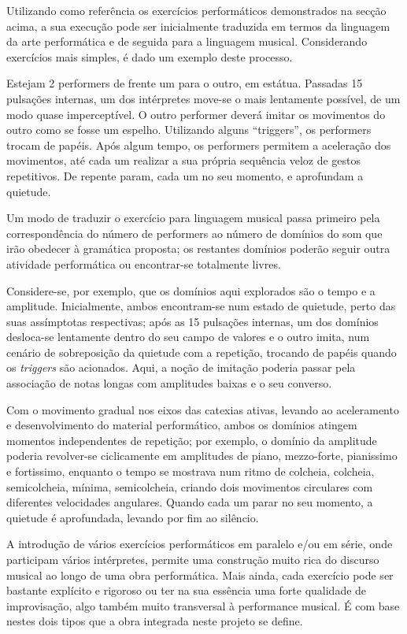 \documentclass[../main.tex]{subfiles}
\begin{document}
Utilizando como referência os exercícios performáticos demonstrados na secção acima, a sua execução pode ser inicialmente traduzida em termos da linguagem da arte performática e de seguida para a linguagem musical. Considerando exercícios mais simples, é dado um exemplo deste processo.

\begin{performex}
    Estejam 2 performers de frente um para o outro, em estátua. Passadas 15 pulsações internas, um dos intérpretes move-se o mais lentamente possível, de um modo quase imperceptível. O outro performer deverá imitar os movimentos do outro como se fosse um espelho. Utilizando alguns \enquote{triggers}, os performers trocam de papéis. Após algum tempo, os performers permitem a aceleração dos movimentos, até cada um realizar a sua própria sequência veloz de gestos repetitivos. De repente param, cada um no seu momento, e aprofundam a quietude.
\end{performex}

Um modo de traduzir o exercício para linguagem musical passa primeiro pela correspondência do número de performers ao número de domínios do som que irão obedecer à gramática proposta; os restantes domínios poderão seguir outra atividade performática ou encontrar-se totalmente livres.

Considere-se, por exemplo, que os domínios aqui explorados são o tempo e a amplitude. Inicialmente, ambos encontram-se num estado de quietude, perto das suas assímptotas respectivas; após as 15 pulsações internas, um dos domínios desloca-se lentamente dentro do seu campo de valores e o outro imita, num cenário de sobreposição da quietude com a repetição, trocando de papéis quando os \textsl{triggers} são acionados. Aqui, a noção de imitação poderia passar pela associação de notas longas com amplitudes baixas e o seu converso.

Com o movimento gradual nos eixos das catexias ativas, levando ao aceleramento e desenvolvimento do material performático, ambos os domínios atingem momentos independentes de repetição; por exemplo, o domínio da amplitude poderia revolver-se ciclicamente em amplitudes de piano, mezzo-forte, pianissimo e fortissimo, enquanto o tempo se mostrava num ritmo de colcheia, colcheia, semicolcheia, mínima, semicolcheia, criando dois movimentos circulares com diferentes velocidades angulares. Quando cada um parar no seu momento, a quietude é aprofundada, levando por fim ao silêncio.

A introdução de vários exercícios performáticos em paralelo e/ou em série, onde participam vários intérpretes, permite uma construção muito rica do discurso musical ao longo de uma obra performática. Mais ainda, cada exercício pode ser bastante explícito e rigoroso ou ter na sua essência uma forte qualidade de improvisação, algo também muito transversal à performance musical. É com base nestes dois tipos que a obra integrada neste projeto se define.
\end{document}
